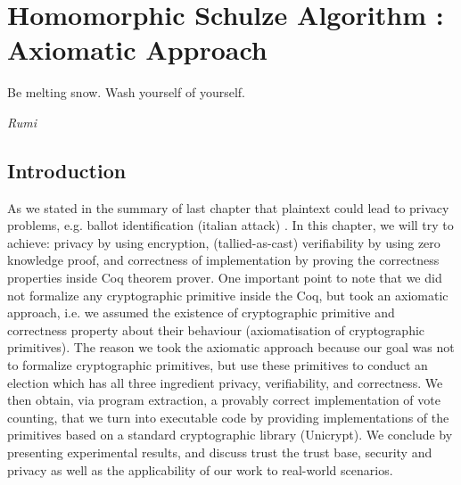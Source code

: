 \chapter{Homomorphic Schulze Algorithm : Axiomatic Approach}
\label{cha:homormorphic_schulze}

\epigraph{Be melting snow. Wash yourself of yourself.} 
{\textit{Rumi}} 

\section{Introduction}
As we stated in the  summary of last chapter that plaintext could lead to 
privacy problems, e.g. ballot identification (italian attack) \cite{Otten}. 
In this chapter, we will try to achieve: privacy by using encryption, (tallied-as-cast) 
verifiability by using zero knowledge proof, and correctness of implementation 
by proving the correctness properties inside Coq theorem prover. 
One important point to note that we did not formalize any cryptographic primitive inside the Coq, but 
took an axiomatic approach, i.e. we assumed the existence of cryptographic 
primitive and correctness property about their behaviour (axiomatisation of 
cryptographic primitives). The reason we took the axiomatic approach 
because our goal was not to formalize cryptographic primitives, but use these primitives
to conduct an election which has all three ingredient privacy, verifiability, 
and correctness. We then obtain, via program extraction, a
provably correct implementation of vote counting, that we turn
into executable code by providing implementations of the primitives
based on a standard cryptographic library (Unicrypt). 
We conclude by presenting
experimental results, and discuss trust the trust base, security and
privacy as well as the applicability of our work to real-world
scenarios. 




